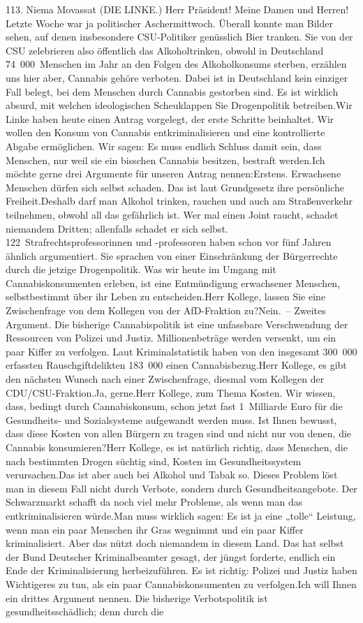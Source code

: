 \documentclass{article}
\begin{document}
	113. Niema Movassat (DIE LINKE.) Herr Präsident! Meine Damen und Herren! Letzte Woche war ja politischer Aschermittwoch. Überall konnte man Bilder sehen, auf denen insbesondere CSU-Politiker genüsslich Bier tranken. Sie von der CSU zelebrieren also öffentlich das Alkoholtrinken, obwohl in Deutschland 74 000 Menschen im Jahr an den Folgen des Alkoholkonsums sterben, erzählen uns hier aber, Cannabis gehöre verboten. Dabei ist in Deutschland kein einziger Fall belegt, bei dem Menschen durch Cannabis gestorben sind. Es ist wirklich absurd, mit welchen ideologischen Scheuklappen Sie Drogenpolitik betreiben.Wir Linke haben heute einen Antrag vorgelegt, der erste Schritte beinhaltet. Wir wollen den Konsum von Cannabis entkriminalisieren und eine kontrollierte Abgabe ermöglichen. Wir sagen: Es muss endlich Schluss damit sein, dass Menschen, nur weil sie ein bisschen Cannabis besitzen, bestraft werden.Ich möchte gerne drei Argumente für unseren Antrag nennen:Erstens. Erwachsene Menschen dürfen sich selbst schaden. Das ist laut Grundgesetz ihre persönliche Freiheit.Deshalb darf man Alkohol trinken, rauchen und auch am Straßenverkehr teilnehmen, obwohl all das gefährlich ist. Wer mal einen Joint raucht, schadet niemandem Dritten; allenfalls schadet er sich selbst. 122 Strafrechtsprofessorinnen und -professoren haben schon vor fünf Jahren ähnlich argumentiert. Sie sprachen von einer Einschränkung der Bürgerrechte durch die jetzige Drogenpolitik. Was wir heute im Umgang mit Cannabiskonsumenten erleben, ist eine Entmündigung erwachsener Menschen, selbstbestimmt über ihr Leben zu entscheiden.Herr Kollege, lassen Sie eine Zwischenfrage von dem Kollegen von der AfD-Fraktion zu?Nein. – Zweites Argument. Die bisherige Cannabispolitik ist eine unfassbare Verschwendung der Ressourcen von Polizei und Justiz. Millionenbeträge werden versenkt, um ein paar Kiffer zu verfolgen. Laut Kriminalstatistik haben von den insgesamt 300 000 erfassten Rauschgiftdelikten 183 000 einen Cannabisbezug.Herr Kollege, es gibt den nächsten Wunsch nach einer Zwischenfrage, diesmal vom Kollegen der CDU/CSU-Fraktion.Ja, gerne.Herr Kollege, zum Thema Kosten. Wir wissen, dass, bedingt durch Cannabiskonsum, schon jetzt fast 1 Milliarde Euro für die Gesundheits- und Sozialsysteme aufgewandt werden muss. Ist Ihnen bewusst, dass diese Kosten von allen Bürgern zu tragen sind und nicht nur von denen, die Cannabis konsumieren?Herr Kollege, es ist natürlich richtig, dass Menschen, die nach bestimmten Drogen süchtig sind, Kosten im Gesundheitssystem verursachen.Das ist aber auch bei Alkohol und Tabak so. Dieses Problem löst man in diesem Fall nicht durch Verbote, sondern durch Gesundheitsangebote. Der Schwarzmarkt schafft da noch viel mehr Probleme, als wenn man das entkriminalisieren würde.Man muss wirklich sagen: Es ist ja eine „tolle“ Leistung, wenn man ein paar Menschen ihr Gras wegnimmt und ein paar Kiffer kriminalisiert. Aber das nützt doch niemandem in diesem Land. Das hat selbst der Bund Deutscher Kriminalbeamter gesagt, der jüngst forderte, endlich ein Ende der Kriminalisierung herbeizuführen. Es ist richtig: Polizei und Justiz haben Wichtigeres zu tun, als ein paar Cannabiskonsumenten zu verfolgen.Ich will Ihnen ein drittes Argument nennen. Die bisherige Verbotspolitik ist gesundheitsschädlich; denn durch die 
\end{document}
